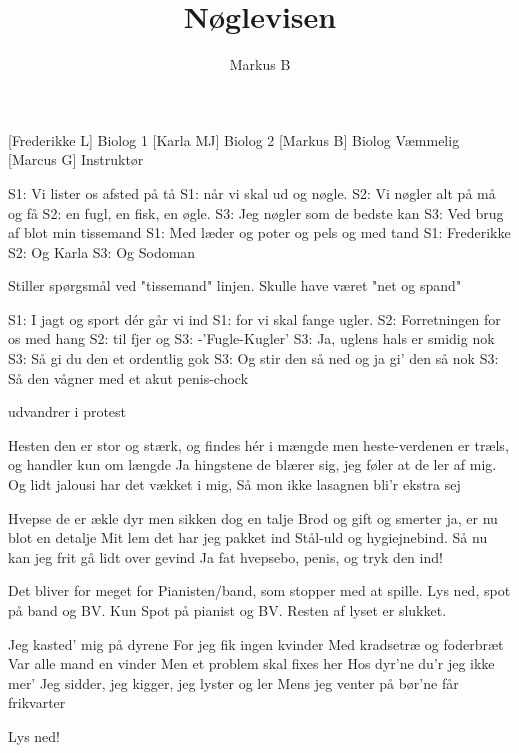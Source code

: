\documentclass[a4paper,11pt]{article}
\title{Nøglevisen}
\author{Markus B}
\begin{document}
\maketitle

\begin{roles}
[Frederikke L] Biolog 1
[Karla MJ] Biolog 2
[Markus B] Biolog Væmmelig
[Marcus G] Instruktør
\end{roles}

\begin{song}


S1: Vi lister os afsted på tå 
S1: når vi skal ud og nøgle.
S2: Vi nøgler alt på må og få
S2: en fugl, en fisk, en øgle.
S3: Jeg nøgler som de bedste kan
S3: Ved brug af blot min tissemand 
S1: Med læder og poter og pels og med tand
S1: Frederikke S2: Og Karla S3: Og Sodoman 

 Stiller spørgsmål ved "tissemand" linjen. Skulle have været "net og spand" 

S1: I jagt og sport dér går vi ind 
S1: for vi skal fange ugler.
S2: Forretningen for os med hang 
S2: til fjer og 
S3: -'Fugle-Kugler'
S3: Ja, uglens hals er smidig nok
S3: Så gi du den et ordentlig gok
S3: Og stir den så ned og ja gi' den så nok
S3: Så den vågner med et akut penis-chock

 udvandrer i protest

Hesten den er stor og stærk, 
og findes hér i mængde
men heste-verdenen er træls, 
og handler kun om længde
Ja hingstene de blærer sig, 
jeg føler at de ler af mig.
Og lidt jalousi har det vækket i mig,
Så mon ikke lasagnen bli'r ekstra sej

Hvepse de er ækle dyr 
men sikken dog en talje
Brod og gift og smerter ja, 
er nu blot en detalje
Mit lem det har jeg pakket ind
Stål-uld og hygiejnebind.
Så nu kan jeg frit gå lidt over gevind
Ja fat hvepsebo, penis, og tryk den ind!

\scene Det bliver for meget for Pianisten/band, som stopper med at spille.
\scene Lys ned, spot på band og BV.
\scene Kun Spot på pianist og BV. Resten af lyset er slukket.

Jeg kasted' mig på dyrene 
For jeg fik ingen kvinder
Med kradsetræ og foderbræt 
Var alle mand en vinder
Men et problem skal fixes her
Hos dyr'ne du'r jeg ikke mer'
Jeg sidder, jeg kigger, jeg lyster og ler
Mens jeg venter på bør'ne får frikvarter

\scene Lys ned!

\end{song}
\end{document}

